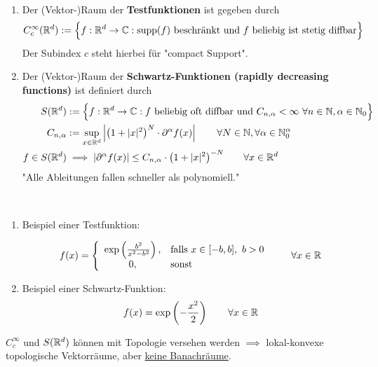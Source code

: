 \begin{defi}\
\begin{enumerate}[label=(\alph*)]
\item Der (Vektor-)Raum der \textbf{Testfunktionen} ist gegeben durch
\begin{align*}
C_c^\infty(\mathbb{R}^d):=\Big\lbrace f:\mathbb{R}^d\to\mathbb{C}:\operatorname{supp}(f)\text{ beschränkt und $f$ beliebig ist stetig diffbar}\Big\rbrace
\end{align*}
Der Subindex $c$ steht hierbei für "compact Support".
\item Der (Vektor-)Raum der \textbf{Schwartz-Funktionen (rapidly decreasing functions)} ist definiert durch
\begin{align*}
S(\mathbb{R}^d)&:=\Big\lbrace f:\mathbb{R}^d\to\mathbb{C}: f\text{ beliebig oft diffbar und }C_{n,\alpha}<\infty~\forall n\in\mathbb{N},\alpha\in\mathbb{N}_0\Big\rbrace\\
C_{n,\alpha}&:=\sup\limits_{x\in\mathbb{R}^d}\left|\left(1+|x|^2\right)^N\cdot\partial^\alpha f(x)\right|\qquad\forall N\in\mathbb{N},\forall\alpha\in\mathbb{N}_0^\alpha\\
f\in S(\mathbb{R}^d) &\implies\left|\partial^\alpha f(x)\right|\leq C_{n,\alpha}\cdot\big(1+|x|^2\big)^{-N}\qquad\forall x\in\mathbb{R}^d
\end{align*}
"Alle Ableitungen fallen schneller als polynomiell."
\end{enumerate}
\end{defi}

\begin{beisp}\
\begin{enumerate}
\item Beispiel einer Testfunktion:

\begin{align*}
f(x)=\left\lbrace\begin{array}{cl}
\exp\left(\frac{b^2}{x^2-b^2}\right), &\text{falls } x\in[-b,b],~b>0\\
0, &\text{sonst }
\end{array}\right.\qquad\forall x\in\mathbb{R}
\end{align*}
\item Beispiel einer Schwartz-Funktion:
\begin{align*}
f(x)=\exp\left(-\frac{x^2}{2}\right)\qquad\forall x\in\mathbb{R}
\end{align*}
\end{enumerate}
\end{beisp}

\begin{bemerkung}
$C_c^\infty$ und $S(\mathbb{R}^d)$ können mit Topologie versehen werden $\implies$ lokal-konvexe topologische Vektorräume, aber \underline{keine Banachräume}.
\end{bemerkung}


